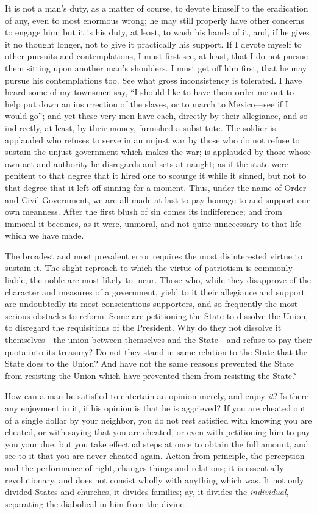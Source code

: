 \documentclass[12pt]{article}
\begin{document}
It is not a man's duty, as a matter of course, to devote himself to the
eradication of any, even to most enormous wrong; he may still properly
have other concerns to engage him; but it is his duty, at least, to wash
his hands of it, and, if he gives it no thought longer, not to give it
practically his support. If I devote myself to other pursuits and
contemplations, I must first see, at least, that I do not pursue them
sitting upon another man's shoulders. I must get off him first, that he
may pursue his contemplations too. See what gross inconsistency is
tolerated. I have heard some of my townsmen say, ``I should like to have
them order me out to help put down an insurrection of the slaves, or to
march to Mexico---see if I would go''; and yet these very men have each,
directly by their allegiance, and so indirectly, at least, by their
money, furnished a substitute. The soldier is applauded who refuses to
serve in an unjust war by those who do not refuse to sustain the unjust
government which makes the war; is applauded by those whose own act and
authority he disregards and sets at naught; as if the state were
penitent to that degree that it hired one to scourge it while it sinned,
but not to that degree that it left off sinning for a moment. Thus,
under the name of Order and Civil Government, we are all made at last to
pay homage to and support our own meanness. After the first blush of sin
comes its indifference; and from immoral it becomes, as it were,
unmoral, and not quite unnecessary to that life which we have made.

The broadest and most prevalent error requires the most disinterested
virtue to sustain it. The slight reproach to which the virtue of
patriotism is commonly liable, the noble are most likely to incur. Those
who, while they disapprove of the character and measures of a
government, yield to it their allegiance and support are undoubtedly its
most conscientious supporters, and so frequently the most serious
obstacles to reform. Some are petitioning the State to dissolve the
Union, to disregard the requisitions of the President. Why do they not
dissolve it themselves---the union between themselves and the
State---and refuse to pay their quota into its treasury? Do not they
stand in same relation to the State that the State does to the Union?
And have not the same reasons prevented the State from resisting the
Union which have prevented them from resisting the State?

How can a man be satisfied to entertain an opinion merely, and enjoy
\emph{it}? Is there any enjoyment in it, if his opinion is that he is
aggrieved? If you are cheated out of a single dollar by your neighbor,
you do not rest satisfied with knowing you are cheated, or with saying
that you are cheated, or even with petitioning him to pay you your due;
but you take effectual steps at once to obtain the full amount, and see
to it that you are never cheated again. Action from principle, the
perception and the performance of right, changes things and relations;
it is essentially revolutionary, and does not consist wholly with
anything which was. It not only divided States and churches, it divides
families; ay, it divides the \emph{individual}, separating the
diabolical in him from the divine.
\end{document}
